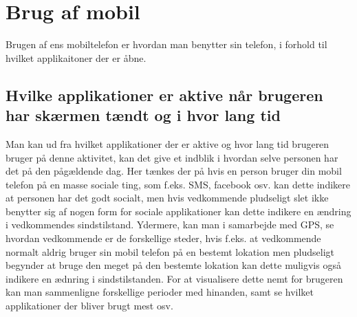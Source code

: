 \section{Brug af mobil}
Brugen af ens mobiltelefon er hvordan man benytter sin telefon, i forhold til hvilket applikaitoner der er åbne.

\subsection{Hvilke applikationer er aktive når brugeren har skærmen tændt og i hvor lang tid}
Man kan ud fra hvilket applikationer der er aktive og hvor lang tid brugeren bruger på denne aktivitet, kan det give et indblik i hvordan selve personen har det på den pågældende dag.
Her tænkes der på hvis en person bruger din mobil telefon på en masse sociale ting, som f.eks. SMS, facebook osv. kan dette indikere at personen har det godt socialt, men hvis vedkommende pludseligt slet ikke benytter sig af nogen form for sociale applikationer kan dette indikere en ændring i vedkommendes sindstilstand.
Ydermere, kan man i samarbejde med GPS, se hvordan vedkommende er de forskellige steder, hvis f.eks. at vedkommende normalt aldrig bruger sin mobil telefon på en bestemt lokation men pludseligt begynder at bruge den meget på den bestemte lokation kan dette muligvis også indikere en ædnring i sindstilstanden.
For at visualisere dette nemt for brugeren kan man sammenligne forskellige perioder med hinanden, samt se hvilket applikationer der bliver brugt mest osv.

